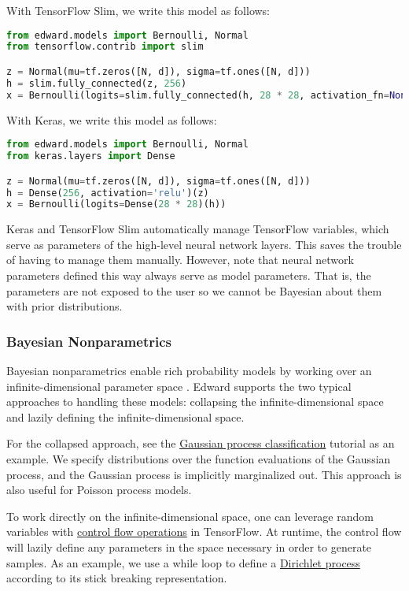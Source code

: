 With TensorFlow Slim, we write this model as follows:

\begin{lstlisting}[language=python]
from edward.models import Bernoulli, Normal
from tensorflow.contrib import slim

z = Normal(mu=tf.zeros([N, d]), sigma=tf.ones([N, d]))
h = slim.fully_connected(z, 256)
x = Bernoulli(logits=slim.fully_connected(h, 28 * 28, activation_fn=None))
\end{lstlisting}

With Keras, we write this model as follows:

\begin{lstlisting}[language=python]
from edward.models import Bernoulli, Normal
from keras.layers import Dense

z = Normal(mu=tf.zeros([N, d]), sigma=tf.ones([N, d]))
h = Dense(256, activation='relu')(z)
x = Bernoulli(logits=Dense(28 * 28)(h))
\end{lstlisting}

Keras and TensorFlow Slim automatically manage TensorFlow variables, which
serve as parameters of the high-level neural network layers. This
saves the trouble of having to manage them manually. However, note
that neural network parameters defined this way always serve as model
parameters. That is, the parameters are not exposed to the user so we
cannot be Bayesian about them with prior distributions.

\subsubsection{Bayesian Nonparametrics}

Bayesian nonparametrics enable rich probability models by working over
an infinite-dimensional parameter space \citep{hjort2010bayesian}.
Edward supports the two typical approaches to handling these models:
collapsing the infinite-dimensional space and lazily defining the
infinite-dimensional space.

For the collapsed approach, see the
\href{/tutorials/supervised-classification}{Gaussian process classification}
tutorial as an example. We specify distributions over the function
evaluations of the Gaussian process, and the Gaussian process is
implicitly marginalized out. This approach is also useful for Poisson
process models.

To work directly on the infinite-dimensional space, one can leverage
random variables with
\href{https://www.tensorflow.org/versions/master/api_docs/python/control_flow_ops.html}{control flow operations}
in TensorFlow. At runtime, the control flow will lazily define any
parameters in the space necessary in order to generate samples. As an
example, we use a while loop to define a
\href{https://github.com/blei-lab/edward/blob/master/examples/pp_dirichlet_process.py}
{Dirichlet process} according to its stick breaking representation.

